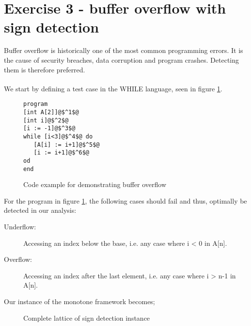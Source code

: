 \section{Exercise 3 - buffer overflow with sign detection}
Buffer overflow is historically one of the most common programming errors. It is the cause of security breaches, data corruption and program crashes. Detecting them is therefore preferred.\\\\
We start by defining a test case in the WHILE language, seen in figure \ref{code:array_example}.
\begin{figure}
  \begin{lstlisting}
program
[int A[2]]@$^1$@
[int i]@$^2$@
[i := -1]@$^3$@
while [i<3]@$^4$@ do
   [A[i] := i+1]@$^5$@
   [i := i+1]@$^6$@
od
end
 \end{lstlisting}
 \label{code:array_example}
 \caption{Code example for demonstrating buffer overflow}
\end{figure}
For the program in figure \ref{code:array_example}, the following cases should fail and thus, optimally be detected in our analysis:
\begin{description}
\item[Underflow:] Accessing an index below the base, i.e. any case where i < 0 in A[n].
\item[Overflow:] Accessing an index after the last element, i.e. any case where i > n-1 in A[n].
\end{description}

Our instance of the monotone framework becomes; 
 \begin{figure}[h]
 \centering
  \caption{Complete lattice of sign detection instance}
 
  \label{fig:sign_detection_complete_lattice}
 \end{figure}

